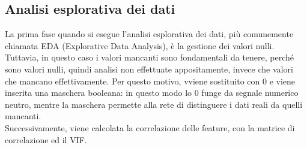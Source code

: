 \documentclass[10pt,a4paper]{article}
\begin{document}
        \subsection*{Analisi esplorativa dei dati}
        La prima fase quando si esegue l'analisi esplorativa dei dati, più comunemente chiamata EDA (Explorative Data
        Analysis), è la gestione dei valori nulli. Tuttavia, in questo caso i valori mancanti sono fondamentali da tenere,
        perché sono valori nulli, quindi analisi non effettuate appositamente, invece che valori che mancano effettivamente.
        Per questo motivo, vviene sostituito con $0$ e viene inserita una maschera booleana: in questo modo lo $0$ 
        funge da segnale numerico neutro, mentre la maschera permette alla rete di distinguere i dati reali da quelli 
        mancanti.\\
        Successivamente, viene calcolata la correlazione delle feature, con la matrice di correlazione ed il VIF.  
\end{document}
